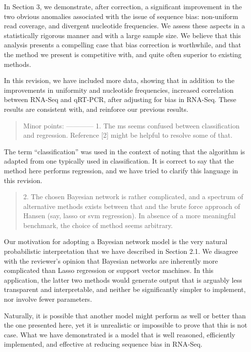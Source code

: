 \documentclass{article}
\begin{document}
In Section 3, we demonstrate, after correction, a significant improvement in
the two obvious anomalies associated with the issue of sequence bias:
non-uniform read coverage, and divergent nucleotide frequencies. We assess these
aspects in a statistically rigorous manner and with a large sample size. We
believe that this analysis presents a compelling case that bias correction is
worthwhile, and that the method we present is competitive with, and quite often
superior to existing methods.

In this revision, we have included more data, showing that in addition to the
improvements in uniformity and nucleotide frequencies, increased correlation
between RNA-Seq and qRT-PCR, after adjusting for bias in RNA-Seq. These results
are consistent with, and reinforce our previous results.


\begin{quote}
Minor points:
------------
1. The ms seems confused between classification and regression.
Reference [2] might be helpful to resolve some of that.
\end{quote}

The term ``classification'' was used in the context of noting that the algorithm
is adapted from one typically used in classification. It is correct to say that
the method here performs regression, and we have tried to clarify this language
in this revision.



\begin{quote}
2. The chosen Bayesian network is rather complicated, and a spectrum
of alternative methods exists between that and the brute force
approach of Hansen (say, lasso or svm regression). In absence of a
more meaningful benchmark, the choice of method seems arbitrary.
\end{quote}

Our motivation for adopting a Bayesian network model is the very natural
probabilistic interpretation that we have described in Section 2.1. We
disagree with the reviewer's opinion that Bayesian networks are inherently more
complicated than Lasso regression or support vector machines.  In this
application, the latter two methods would generate output that is arguably less
transparent and interpretable, and neither be significantly simpler to
implement, nor involve fewer parameters.

Naturally, it is possible that another model might perform as well or better
than the one presented here, yet it is unrealistic or impossible to prove that
this is not case. What we have demonstrated is a model that is well reasoned,
efficiently implemented, and effective at reducing sequence bias in RNA-Seq.
\end{document}
